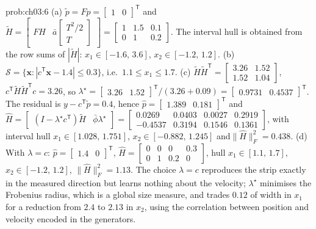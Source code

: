 \begin{sol}{prob:ch03:6}
(a) $\tilde p=Fp=\begin{bmatrix}1&0\end{bmatrix}^{\mathsf T}$ and\allowbreak $\tilde H=\begin{bmatrix}FH&\bar a\begin{bmatrix}T^{2}/2\\T\end{bmatrix}\end{bmatrix}=\begin{bmatrix}1&1.5&0.1\\0&1&0.2\end{bmatrix}$. The interval hull is obtained from the row sums of $|\tilde H|$: $x_1\in[-1.6,\,3.6]$, $x_2\in[-1.2,\,1.2]$.
(b) $\mathcal{S}=\{\mathbf{x}:|c^{\mathsf T}\mathbf{x}-1.4|\le0.3\}$, i.e.\ $1.1\le x_1\le1.7$.
(c) $\tilde H\tilde H^{\mathsf T}=\begin{bmatrix}3.26&1.52\\1.52&1.04\end{bmatrix}$, $c^{\mathsf T}\tilde H\tilde H^{\mathsf T}c=3.26$, so $\lambda^{\star}=\begin{bmatrix}3.26&1.52\end{bmatrix}^{\mathsf T}/(3.26+0.09)=\begin{bmatrix}0.9731&0.4537\end{bmatrix}^{\mathsf T}$. The residual is $y-c^{\mathsf T}\tilde p=0.4$, hence $\hat p=\begin{bmatrix}1.389&0.181\end{bmatrix}^{\mathsf T}$ and
$\hat H=\begin{bmatrix}(I-\lambda^{\star}c^{\mathsf T})\tilde H&\bar\phi\lambda^{\star}\end{bmatrix}=\begin{bmatrix}0.0269&0.0403&0.0027&0.2919\\-0.4537&0.3194&0.1546&0.1361\end{bmatrix}$,
with interval hull $x_1\in[1.028,\,1.751]$, $x_2\in[-0.882,\,1.245]$ and\allowbreak $\|\hat H\|_F^{2}=0.438$.
(d) With $\lambda=c$: $\hat p=\begin{bmatrix}1.4&0\end{bmatrix}^{\mathsf T}$, $\hat H=\begin{bmatrix}0&0&0&0.3\\0&1&0.2&0\end{bmatrix}$, hull $x_1\in[1.1,\,1.7]$, $x_2\in[-1.2,\,1.2]$, $\|\hat H\|_F^{2}=1.13$. The choice $\lambda=c$ reproduces the strip exactly in the measured direction but learns nothing about the velocity; $\lambda^{\star}$ minimises the Frobenius radius, which is a global size measure, and trades $0.12$ of width in $x_1$ for a reduction from $2.4$ to $2.13$ in $x_2$, using the correlation between position and velocity encoded in the generators.

\end{sol}
